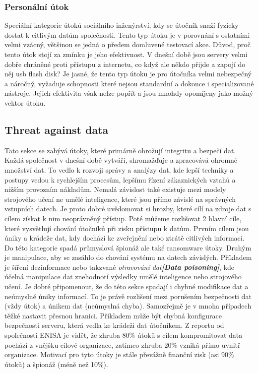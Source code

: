 \subsubsection{Personální útok}
Speciální kategorie útoků sociálního inženýrství, kdy se útočník snaží fyzicky dostat k citlivým datům společnosti.
Tento typ útoku je v porovnání s ostatními velmi vzácný, většinou se jedná o předem domluvené testovací akce.
Důvod, proč tento útok stojí za zmínku je jeho efektivnost.
V dnešní době jsou servery velmi dobře chráněné proti přístupu z internetu, co když ale někdo přijde a zapojí do něj usb flash disk?
Je jasné, že tento typ útoku je pro útočníka velmi nebezpečný a náročný, vyžaduje schopnosti které nejsou standardní a dokonce i specializované nástroje.
Jejich efektivita však nelze popřít a jsou mnohdy opomíjeny jako možný vektor útoku.\cite{moje_bakalarka}


\subsection{Threat against data}\label{subsec:threat-against-data}
Tato sekce se zabývá útoky, které primárně ohrožují integritu a bezpečí dat.
Každá společnost v dnešní době vytváří, shromažďuje a zpracovává ohromné množství dat.
To vedlo k rozvoji správy a analýzy dat, kde lepší techniky a postupy vedou k rychlejším procesům, lepšímu řízení zákaznických vztahů a nižším provozním nákladům.
Nemalá závislost také existuje mezi modely strojového učení ne umělé inteligence, které jsou přímo závislé na správných vstupních datech.
Je proto dobré uvědomovat si hrozby, které cílí na zdroje dat s cílem získat k nim neoprávněný přístup.
Poté můžeme rozlišovat 2 hlavní cíle, které vysvětlují chování útočníků při zisku přístupu k datům.
Prvním cílem jsou úniky a krádeže dat, kdy dochází ke zveřejnění nebo ztrátě citlivých informací.
Do této kategorie spadá průmyslová špionáž ale také ransomware útoky.
Druhým je manipulace, aby se zasáhlo do chování systému na datech závislých.
Příkladem je šíření dezinformace nebo takzvané \textit{otravování dat\textbf{[Data poisoning]}}, kde účelná manipulace dat znehodnotí výsledky umělé inteligence nebo strojového učení.
Je dobré připomenout, že do této sekce spadají i chybné modifikace dat a neúmyslné úniky informací.
To je právě rozlišení mezi porušením bezpečnosti dat (vždy útok) a únikem dat (neúmyslná chyba).
Samozřejmě je v mnoha případech těžké nastavit přesnou hranici.
Příkladem může být chybná konfigurace bezpečnosti serveru, která vedla ke krádeži dat útočníkem.
Z reportu od společnosti \ac{ENISA} je vidět, že zhruba 80\% útoků s cílem kompromitovat data pochází z vnějšku cílové organizace, zatímco zhruba 20\% vzniká přímo uvnitř organizace.
Motivací pro tyto útoky je stále převážně finanční zisk (asi 90\% útoků) a špionáž (méně než 10\%).\cite{Enisa_thread_landscape}

